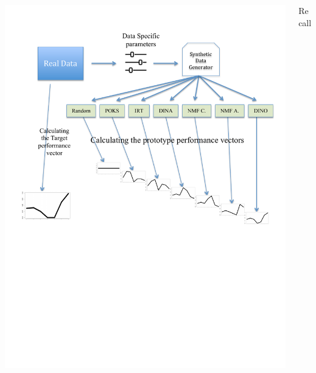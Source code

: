 \documentclass{beamer}
\begin{document}
\begin{frame}
\begin{overprint}
\begin{columns}
\begin{column}{0.7\textwidth}
			\includegraphics[trim=1cm 10cm 1cm 1cm,scale=0.43]{images/Approach3.pdf}
		\end{column}
		\begin{column}{0.3\textwidth}
			\hspace{1.5cm}Recall
          

\end{column}
\end{columns}
\end{overprint}
\end{frame}
\end{document}

